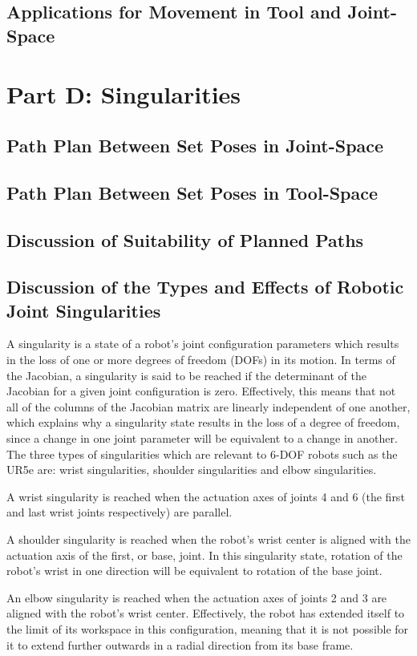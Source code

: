 \documentclass[fleqn]{article}
\begin{document}
\subsection{Applications for Movement in Tool and Joint-Space}

\section{Part D: Singularities}
\subsection{Path Plan Between Set Poses in Joint-Space}

\subsection{Path Plan Between Set Poses in Tool-Space}

\subsection{Discussion of Suitability of Planned Paths}

\subsection{Discussion of the Types and Effects of Robotic Joint Singularities}
A singularity is a state of a robot's joint configuration parameters which results in the loss of one or more degrees of freedom (DOFs) in its motion.
In terms of the Jacobian, a singularity is said to be reached if the determinant of the Jacobian for a given joint configuration is zero. Effectively,
this means that not all of the columns of the Jacobian matrix are linearly independent of one another, which explains why a singularity state results in the loss
of a degree of freedom, since a change in one joint parameter will be equivalent to a change in another. The three types of singularities which are relevant to
6-DOF robots such as the UR5e are: wrist singularities, shoulder singularities and elbow singularities.

A wrist singularity is reached when the actuation axes of joints 4 and 6 (the first and last wrist joints respectively) are parallel.

A shoulder singularity is reached when the robot's wrist center is aligned with the actuation axis of the first, or base, joint. In this singularity state, rotation of the robot's wrist
in one direction will be equivalent to rotation of the base joint.

An elbow singularity is reached when the actuation axes of joints 2 and 3 are aligned with the robot's wrist center. Effectively, the robot has extended itself to the limit
of its workspace in this configuration, meaning that it is not possible for it to extend further outwards in a radial direction from its base frame.
\end{document}
